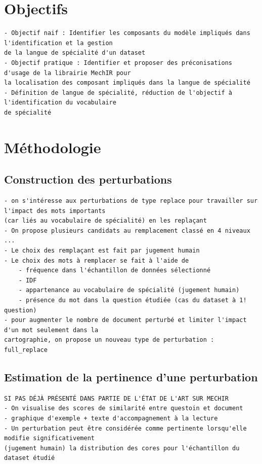 \section{Objectifs}

    \begin{verbatim}
- Objectif naif : Identifier les composants du modèle impliqués dans l'identification et la gestion 
de la langue de spécialité d'un dataset
- Objectif pratique : Identifier et proposer des préconisations d'usage de la librairie MechIR pour 
la localisation des composant impliqués dans la langue de spécialité
- Définition de langue de spécialité, réduction de l'objectif à l'identification du vocabulaire 
de spécialité 
    \end{verbatim}


\section{Méthodologie}
    \subsection{Construction des perturbations}
        \begin{verbatim}
- on s'intéresse aux perturbations de type replace pour travailler sur l'impact des mots importants
(car liés au vocabulaire de spécialité) en les replaçant
- On propose plusieurs candidats au remplacement classé en 4 niveaux ...
- Le choix des remplaçant est fait par jugement humain
- Le choix des mots à remplacer se fait à l'aide de 
    - fréquence dans l'échantillon de données sélectionné
    - IDF 
    - appartenance au vocabulaire de spécialité (jugement humain)
    - présence du mot dans la question étudiée (cas du dataset à 1! question)
- pour augmenter le nombre de document perturbé et limiter l'impact d'un mot seulement dans la 
cartographie, on propose un nouveau type de perturbation : full_replace
        \end{verbatim}

    \subsection{Estimation de la pertinence d'une perturbation}
        \begin{verbatim}
SI PAS DÉJÀ PRÉSENTÉ DANS PARTIE DE L'ÉTAT DE L'ART SUR MECHIR
- On visualise des scores de similarité entre questoin et document
- graphique d'exemple + texte d'accompagnement à la lecture
- Un perturbation peut être considérée comme pertinente lorsqu'elle modifie significativement 
(jugement humain) la distribution des cores pour l'échantillon du dataset étudié
        \end{verbatim}

